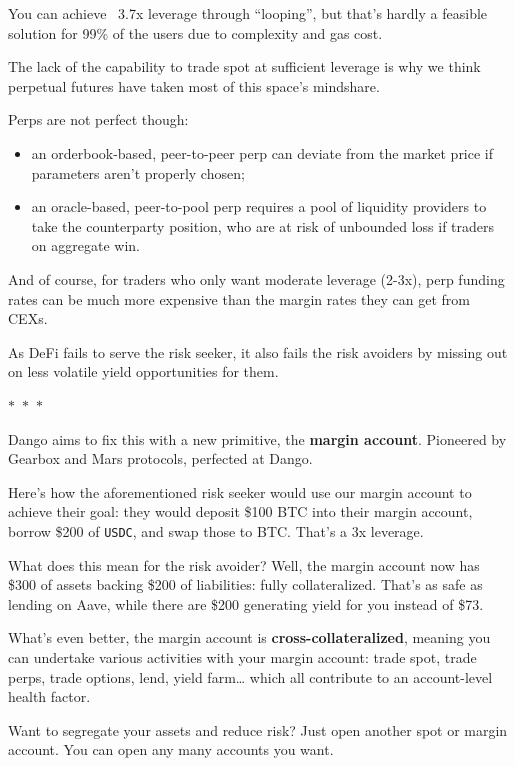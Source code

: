 \documentclass{article}
\newcommand{\separator}{%
  \begin{center}
    $\ast$~$\ast$~$\ast$
  \end{center}
}
\begin{document}
You can achieve ~3.7x leverage through ``looping'', but that's hardly a feasible solution for 99\% of the users due to complexity and gas cost.

The lack of the capability to trade spot at sufficient leverage is why we think perpetual futures have taken most of this space's mindshare.

Perps are not perfect though:

\begin{itemize}
  \item an orderbook-based, peer-to-peer perp can deviate from the market price if parameters aren't properly chosen;
  \item an oracle-based, peer-to-pool perp requires a pool of liquidity providers to take the counterparty position, who are at risk of unbounded loss if traders on aggregate win.
\end{itemize}

And of course, for traders who only want moderate leverage (2-3x), perp funding rates can be much more expensive than the margin rates they can get from CEXs.

As DeFi fails to serve the risk seeker, it also fails the risk avoiders by missing out on less volatile yield opportunities for them.

\separator

Dango aims to fix this with a new primitive, the \textbf{margin account}. Pioneered by Gearbox\supercite{gearboxprotocol} and Mars\supercite{marsprotocol} protocols, perfected at Dango.

Here's how the aforementioned risk seeker would use our margin account to achieve their goal: they would deposit \$100 BTC into their margin account, borrow \$200 of \texttt{USDC}, and swap those to BTC. That's a 3x leverage.

What does this mean for the risk avoider? Well, the margin account now has \$300 of assets backing \$200 of liabilities: fully collateralized. That's as safe as lending on Aave, while there are \$200 generating yield for you instead of \$73.

What's even better, the margin account is \textbf{cross-collateralized}, meaning you can undertake various activities with your margin account: trade spot, trade perps, trade options, lend, yield farm… which all contribute to an account-level health factor.

Want to segregate your assets and reduce risk? Just open another spot or margin account. You can open any many accounts you want.
\end{document}
